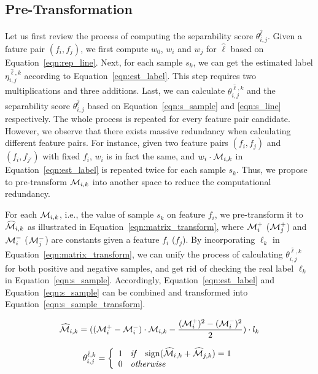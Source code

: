 \subsection{Pre-Transformation} \label{ssec:trans}
 Let us first review the process of computing the separability score $\theta_{i,j}^{\hat{\ell}}$. Given a fature pair $(f_i,f_j)$, we first compute $w_0$, $w_i$ and $w_j$ for $\hat{\ell}$ based on Equation~\ref{eqn:rep_line}. Next, for each sample $s_k$, we can get the estimated label $\eta_{i,j}^{\hat{\ell},k}$ according to Equation~\ref{eqn:est_label}. This step requires two multiplications and three additions. Last, we can calculate $\theta_{i,j}^{\hat{\ell},k}$ and the separability score $\theta_{i,j}^{\hat{\ell}}$ based on Equation~\ref{eqn:s_sample} and \ref{eqn:s_line} respectively. The whole process is repeated for every feature pair candidate. However, we observe that there exists massive redundancy when calculating different feature pairs. For instance, given two feature pairs $(f_i,f_j)$ and $(f_i,f_{j'})$ with fixed $f_i$, $w_i$ is in fact the same, and $w_i\cdot \mm_{i,k}$ in Equation~\ref{eqn:est_label} is repeated twice for each sample $s_k$. Thus, we propose to pre-transform $\mm_{i,k}$ into another space to reduce the computational redundancy.

 For each $\mm_{i,k}$, i.e., the value of sample $s_k$ on feature $f_i$, we pre-transform it to $\widehat{\mm}_{i,k}$ as illustrated in Equation~\ref{eqn:matrix_transform}, where $\mm_i^+$ ($\mm_j^+$) and $\mm_i^-$ ($\mm_j^-$) are constants given a feature $f_i$ ($f_j$). By incorporating $\ell_k$ in Equation~\ref{eqn:matrix_transform}, we can unify the process of calculating $\theta_{i,j}^{\hat{\ell},k}$ for both positive and negative samples, and get rid of checking the real label $\ell_k$ in Equation~\ref{eqn:s_sample}. Accordingly, Equation~\ref{eqn:est_label} and Equation~\ref{eqn:s_sample} can be combined and transformed into Equation~\ref{eqn:s_sample_transform}.

\begin{equation}\label{eqn:matrix_transform}
\widehat{\mm}_{i,k} = ((\mm_i^+-\mm_i^-)\cdot \mm_{i,k}-\frac{(\mm_i^+)^2-(\mm_i^-)^2}{2})\cdot l_k 
\end{equation}

\begin{equation}\label{eqn:s_sample_transform}
\theta_{i,j}^{\hat{\ell},k}=\left\{
                \begin{array}{ll}
                  1 \textit{\hspace{2mm} if \hspace{2mm}} \sign(\widehat{\mm}_{i,k} + \widehat{\mm}_{j,k}) = 1\\
                  0 \textit{\hspace{2mm} otherwise \hspace{2mm}} 
                \end{array}
              \right.
\end{equation}

